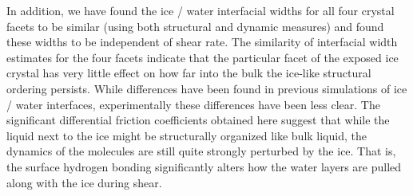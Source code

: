In addition, we have found the ice / water interfacial widths for all
four crystal facets to be similar (using both structural and dynamic
measures) and found these widths to be independent of shear rate.  The
similarity of interfacial width estimates for the four facets indicate
that the particular facet of the exposed ice crystal has very little
effect on how far into the bulk the ice-like structural ordering
persists. While differences have been found in previous simulations of
ice / water interfaces,\cite{Hayward2001,Hayward2002} experimentally
these differences have been less clear.\cite{Beaglehole1993} The
significant differential friction coefficients obtained here suggest
that while the liquid next to the ice might be structurally organized
like bulk liquid, the dynamics of the molecules are still quite
strongly perturbed by the ice.  That is, the surface hydrogen bonding
significantly alters how the water layers are pulled along with the
ice during shear.







